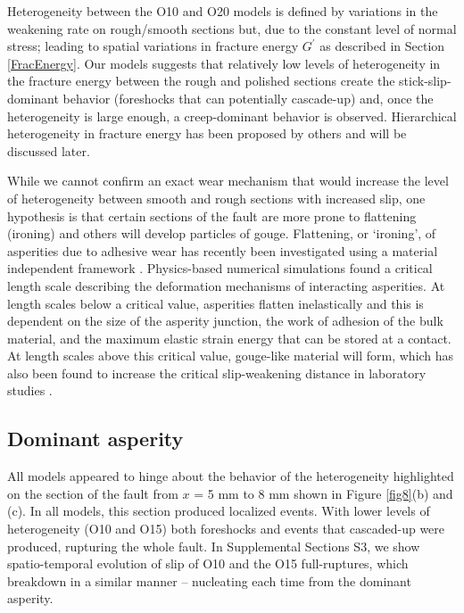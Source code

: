 \documentclass[preprint,1p, 10pt,authoryear]{elsarticle}
\begin{document}
Heterogeneity between the O10 and O20 models is defined by variations in the weakening rate on rough/smooth sections but, due to the constant level of normal stress; leading to spatial variations in fracture energy $G^{'}$ as described in Section \ref{FracEnergy}. Our models suggests that relatively low levels of heterogeneity in the fracture energy between the rough and polished sections create the stick-slip-dominant behavior (foreshocks that can potentially cascade-up) and, once the heterogeneity is large enough, a creep-dominant behavior is observed. Hierarchical heterogeneity in fracture energy has been proposed by others \citep{Ide2005, Aochi2014, Aochi2017} and will be discussed later.

While we cannot confirm an exact wear mechanism that would increase the level of heterogeneity between smooth and rough sections with increased slip, one hypothesis is that certain sections of the fault are more prone to flattening (ironing) and others will develop particles of gouge. Flattening, or ‘ironing’, of asperities due to adhesive wear has recently been investigated using a material independent framework \citep{Aghababaei2016}. Physics-based numerical simulations found a critical length scale describing the deformation mechanisms of interacting asperities. At length scales below a critical value, asperities flatten inelastically and this is dependent on the size of the asperity junction, the work of adhesion of the bulk material, and the maximum elastic strain energy that can be stored at a contact. At length scales above this critical value, gouge-like material will form, which has also been found to increase the critical slip-weakening distance in laboratory studies \citep{Marone1998}.   

\subsection{Dominant asperity}
All models appeared to hinge about the behavior of the heterogeneity highlighted on the section of the fault from $x$ = 5 mm to 8 mm shown in Figure \ref{fig8}(b) and (c). In all models, this section produced localized events. With lower levels of heterogeneity (O10 and O15) both foreshocks and events that cascaded-up were produced, rupturing the whole fault. In Supplemental Sections S3, we show spatio-temporal evolution of slip of O10 and the O15 full-ruptures, which breakdown in a similar manner -- nucleating each time from the dominant asperity.
\end{document}
